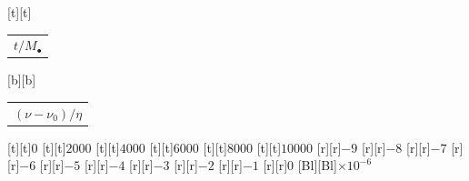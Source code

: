 %    
%
%
\begin{psfrags}%
\psfragscanon%
%
[t][t]{\color[rgb]{0,0,0}\setlength{\tabcolsep}{0pt}\begin{tabular}{c}{\Large$t/M_\bullet$}\end{tabular}}%
[b][b]{\color[rgb]{0,0,0}\setlength{\tabcolsep}{0pt}\begin{tabular}{c}{\Large$(\nu - \nu_0)/\eta$}\end{tabular}}%
%
[t][t]{$0$}%
[t][t]{$2000$}%
[t][t]{$4000$}%
[t][t]{$6000$}%
[t][t]{$8000$}%
[t][t]{$10000$}%
%
[r][r]{$-9$}%
[r][r]{$-8$}%
[r][r]{$-7$}%
[r][r]{$-6$}%
[r][r]{$-5$}%
[r][r]{$-4$}%
[r][r]{$-3$}%
[r][r]{$-2$}%
[r][r]{$-1$}%
[r][r]{$0$}%
[Bl][Bl]{$\times 10^{-6}$}%
%
%
\end{psfrags}%
%

